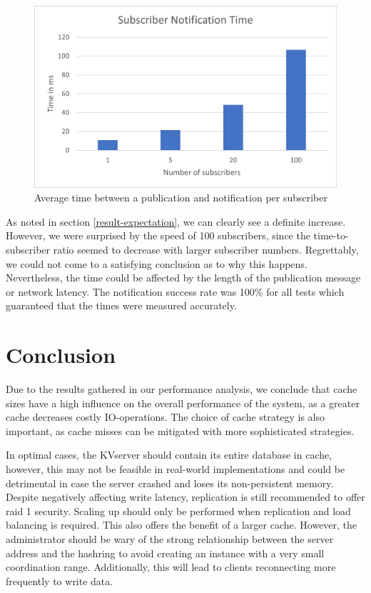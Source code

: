 \documentclass[sigconf]{acmart}
\begin{document}
\begin{center}
  \begin{figure}[htbp]
    \centerline{\includegraphics[scale=0.6]{attachments/SubscriberChart.png}}
    \caption{Average time between a publication and notification per subscriber}
    \label{SubscriberChart}
  \end{figure}
\end{center}

As noted in section \ref{result-expectation}, we can clearly see a definite increase. However, we were surprised by the speed of 100 subscribers, since the time-to-subscriber ratio seemed to decrease with larger subscriber numbers. Regrettably, we could not come to a satisfying conclusion as to why this happens. Nevertheless, the time could be affected by the length of the publication message or network latency. The notification success rate was 100\% for all tests which guaranteed that the times were measured accurately. 

\section{Conclusion}
Due to the results gathered in our performance analysis, we conclude that cache sizes have a high influence on the overall performance of the system, as a greater cache decreases costly IO-operations. The choice of cache strategy is also important, as cache misses can be mitigated with more sophisticated strategies.

In optimal cases, the KVserver should contain its entire database in cache, however, this may not be feasible in real-world implementations and could be detrimental in case the server crashed and loses its non-persistent memory. Despite negatively affecting write latency, replication is still recommended to offer raid 1 security. Scaling up should only be performed when replication and load balancing is required. This also offers the benefit of a larger cache. However, the administrator should be wary of the strong relationship between the server address and the hashring to avoid creating an instance with a very small coordination range. Additionally, this will lead to clients reconnecting more frequently to write data.
\end{document}

